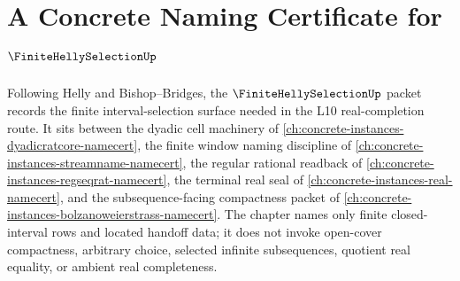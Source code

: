 \chapter{A Concrete Naming Certificate for $\FiniteHellySelectionUp$}
\label{ch:concrete-instances-finite-helly-selection-namecert}

Following Helly and Bishop--Bridges, the $\FiniteHellySelectionUp$ packet records the finite interval-selection surface needed in the L10 real-completion route. It sits between the dyadic cell machinery of \autoref{ch:concrete-instances-dyadicratcore-namecert}, the finite window naming discipline of \autoref{ch:concrete-instances-streamname-namecert}, the regular rational readback of \autoref{ch:concrete-instances-regseqrat-namecert}, the terminal real seal of \autoref{ch:concrete-instances-real-namecert}, and the subsequence-facing compactness packet of \autoref{ch:concrete-instances-bolzanoweierstrass-namecert}. The chapter names only finite closed-interval rows and located handoff data; it does not invoke open-cover compactness, arbitrary choice, selected infinite subsequences, quotient real equality, or ambient real completeness.

